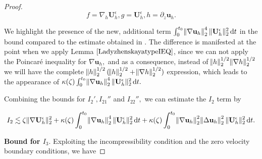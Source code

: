 \documentclass[12pt]{report}
\numberwithin{theorem}{chapter}
\numberwithin{corollary}{chapter}
\numberwithin{lemma}{chapter}
\numberwithin{remark}{chapter}
\numberwithin{definition}{chapter}
\numberwithin{prop}{chapter}
\newcommand*\diff{\mathop{}\!\mathrm{d}}
\begin{document}
\begin{proof}
  $$f = \nabla_h \mathbf{U}_h^\epsilon, g = \mathbf{U}_h^\epsilon, h = \partial_z \mathbf{u}_h.$$
   
  We highlight the presence of the new, additional term $\int_0^{t_0} \norm{\nabla \mathbf{u}_h}_2^4 \| \mathbf{U}_h^\epsilon \| _2^2 \diff t$ in the bound compared to the estimate obtained in \cite{li2019primitive}. The difference is manifested at the point when we apply Lemma $\ref{LadyzhenskayatypeIEQ}$, since we can not apply the Poincar\'e inequality for $\nabla \mathbf{u}_h,$ and as a consequence, instead of $\norm{h}_2^{1/2} \norm{\nabla h}_2^{1/2}$ we will have the complete $\norm{h}_2^{1/2} (\norm{h}_2^{1/2} + \norm{\nabla h}_2^{1/2})$  expression, which leads to the appearance of $\kappa(\zeta) \int_0^{t_0} \norm{\nabla \mathbf{u}_h}_2^4 \| \mathbf{U}_h^\epsilon \|_2^2 \diff t.$
  
  Combining the bounds for $I_2', I_{21}''$ and $I_{22}'',$ we can estimate the $I_2$ term by
  
  $$ I_2 \lesssim \zeta \| \nabla \mathbf{U}_h^\epsilon \| ^2_2 + \kappa(\zeta) \int_0^{t_0} \norm{\nabla \mathbf{u}_h}_2^4 \| \mathbf{U}_h^\epsilon \| _2^2 \diff t + \kappa(\zeta) \int_0^{t_0} \norm{\nabla \mathbf{u}_h}_2^2  \norm{\Delta \mathbf{u}_h}_2^2 \| \mathbf{U}_h^\epsilon \| _2^2 \diff t. $$
  
  \textbf{Bound for $I_3.$} Exploiting the incompressibility condition and the zero velocity boundary conditions, we have
  

\end{proof}
\end{document}
